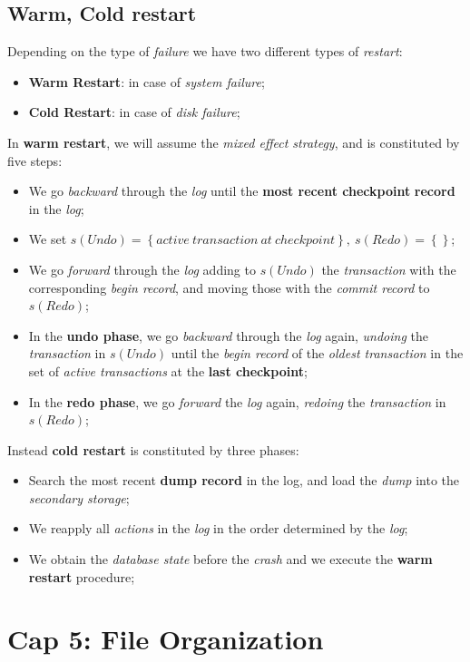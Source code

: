 \documentclass{article}
\begin{document}
\subsection{Warm, Cold restart}
Depending on the type of \emph{failure} we have two different types of \emph{restart}:
\begin{itemize}
\item \textbf{Warm Restart}: in case of \emph{system failure};
\item \textbf{Cold Restart}: in case of \emph{disk failure};
\end{itemize}
In \textbf{warm restart}, we will assume the \emph{mixed effect strategy}, and is constituted by five steps:
\begin{itemize}
\item We go \emph{backward} through the \emph{log} until the \textbf{most recent checkpoint} \textbf{record} in the \emph{log};
\item We set $s(Undo)= \left \{ active\ transaction\ at\ checkpoint \right \},\ s(Redo)=\left \{  \right \}$;
\item We go \emph{forward} through the \emph{log} adding to $s(Undo)$ the \emph{transaction} with the corresponding \emph{begin record}, and moving those with the \emph{commit record} to $s(Redo)$;
\item In the \textbf{undo phase}, we go \emph{backward} through the \emph{log} again, \emph{undoing} the \emph{transaction} in $s(Undo)$ until the \emph{begin record} of the \emph{oldest transaction} in the set of \emph{active transactions} at the \textbf{last checkpoint};
\item In the \textbf{redo phase}, we go \emph{forward} the \emph{log} again, \emph{redoing} the \emph{transaction} in $s(Redo)$;
\end{itemize}
Instead \textbf{cold restart} is constituted by three phases:
\begin{itemize}
\item Search the most recent \textbf{dump record} in the log, and load the \emph{dump} into the \emph{secondary storage};
\item We reapply all \emph{actions} in the \emph{log} in the order determined by the \emph{log};
\item We obtain the \emph{database state} before the \emph{crash} and we execute the \textbf{warm restart} procedure;
\end{itemize}
\clearpage
\section{Cap 5: File Organization}
\end{document}

